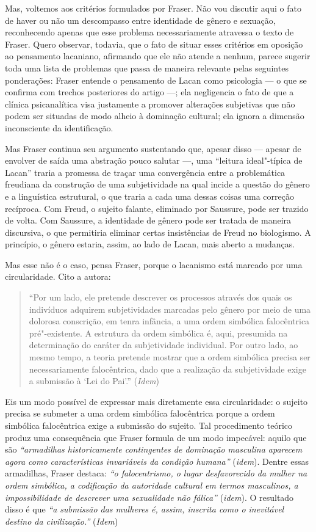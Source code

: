 Mas, voltemos aos critérios formulados por Fraser. Não vou discutir aqui
o fato de haver ou não um descompasso entre identidade de gênero e
sexuação, reconhecendo apenas que esse problema necessariamente
atravessa o texto de Fraser. Quero observar, todavia, que o fato de
situar esses critérios em oposição ao pensamento lacaniano, afirmando
que ele não atende a nenhum, parece sugerir toda uma lista de problemas
que passa de maneira relevante pelas seguintes ponderações: Fraser
entende o pensamento de Lacan como psicologia --- o que se confirma com
trechos posteriores do artigo ---; ela negligencia o fato de que a
clínica psicanalítica visa justamente a promover alterações subjetivas
que não podem ser situadas de modo alheio à dominação cultural; ela
ignora a dimensão inconsciente da identificação.

Mas Fraser continua seu argumento sustentando que, apesar disso ---
apesar de envolver de saída uma abstração pouco salutar ---, uma
``leitura ideal"-típica de Lacan'' traria a promessa de traçar uma
convergência entre a problemática freudiana da construção de uma
subjetividade na qual incide a questão do gênero e a linguística
estrutural, o que traria a cada uma dessas coisas uma correção
recíproca. Com Freud, o sujeito falante, eliminado por Saussure, pode
ser trazido de volta. Com Saussure, a identidade de gênero pode ser
tratada de maneira discursiva, o que permitiria eliminar certas
insistências de Freud no biologismo. A princípio, o gênero estaria,
assim, ao lado de Lacan, mais aberto a mudanças.

Mas esse não é o caso, pensa Fraser, porque o lacanismo está marcado por
uma circularidade. Cito a autora:

\begin{quote}
``Por um lado, ele pretende descrever os processos através dos quais os
indivíduos adquirem subjetividades marcadas pelo gênero por meio de uma
dolorosa conscrição, em tenra infância, a uma ordem simbólica
falocêntrica pré"-existente. A estrutura da ordem simbólica é, aqui,
presumida na determinação do caráter da subjetividade individual. Por
outro lado, ao mesmo tempo, a teoria pretende mostrar que a ordem
simbólica precisa ser necessariamente falocêntrica, dado que a
realização da subjetividade exige a submissão à `Lei do Pai'.''
(\emph{Idem})
\end{quote}

Eis um modo possível de expressar mais diretamente essa circularidade: o
sujeito precisa se submeter a uma ordem simbólica falocêntrica porque a
ordem simbólica falocêntrica exige a submissão do sujeito. Tal
procedimento teórico produz uma consequência que Fraser formula de um
modo impecável: aquilo que são \emph{``armadilhas historicamente
contingentes de dominação masculina aparecem agora como características
invariáveis da condição humana''} (\emph{idem}). Dentre essas
armadilhas, Fraser destaca: \emph{``o falocentrismo, o lugar
desfavorecido da mulher na ordem simbólica, a codificação da autoridade
cultural em termos masculinos, a impossibilidade de descrever uma
sexualidade não fálica''} (\emph{idem}). O resultado disso é que
\emph{``a submissão das mulheres é, assim, inscrita como o inevitável
destino da civilização.''} (\emph{Idem})

